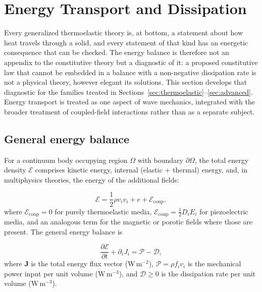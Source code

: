 \section{Energy Transport and Dissipation}
\label{sec:energy}

Every generalized thermoelastic theory is, at bottom, a statement about how heat travels through a solid, and every statement of that kind has an energetic consequence that can be checked. The energy balance is therefore not an appendix to the constitutive theory but a diagnostic of it: a proposed constitutive law that cannot be embedded in a balance with a non-negative dissipation rate is not a physical theory, however elegant its solutions. This section develops that diagnostic for the families treated in Sections~\ref{sec:thermoelastic}--\ref{sec:advanced}. Energy transport is treated as one aspect of wave mechanics, integrated with the broader treatment of coupled-field interactions rather than as a separate subject.

\subsection{General energy balance}
\label{sec:10.1}

For a continuum body occupying region $\Omega$ with boundary $\partial\Omega$, the total energy density $\mathcal{E}$ comprises kinetic energy, internal (elastic + thermal) energy, and, in multiphysics theories, the energy of the additional fields:

\begin{equation}
\mathcal{E} = \frac{1}{2}\rho v_i v_i + e + \mathcal{E}_{\mathrm{coup}},
\label{eq:10.1}
\end{equation}
where $\mathcal{E}_{\mathrm{coup}} = 0$ for purely thermoelastic media, $\mathcal{E}_{\mathrm{coup}} = \frac{1}{2}D_i E_i$ for piezoelectric media, and an analogous term for the magnetic or porotic fields where those are present. The general energy balance is

\begin{equation}
\frac{\partial\mathcal{E}}{\partial t} + \partial_i J_i = \mathcal{P} - \mathcal{D},
\label{eq:10.2}
\end{equation}
where $\bm{J}$ is the total energy flux vector (W\,m$^{-2}$), $\mathcal{P} = \rho f_i v_i$ is the mechanical power input per unit volume (W\,m$^{-3}$), and $\mathcal{D} \geq 0$ is the dissipation rate per unit volume (W\,m$^{-3}$).

